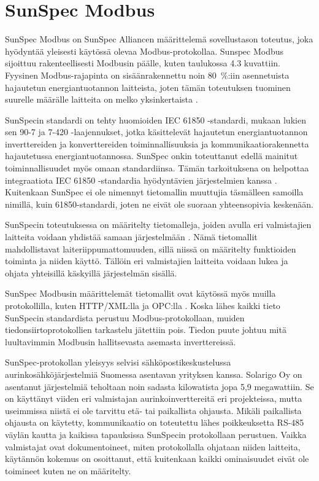 \section{SunSpec Modbus}
  SunSpec Modbus on SunSpec Alliancen määrittelemä sovellustason toteutus, joka hyödyntää yleisesti käytössä olevaa Modbus-protokollaa. Sunspec Modbus sijoittuu rakenteellisesti Modbusin päälle, kuten taulukossa 4.3 kuvattiin. Fyysinen Modbus-rajapinta on sisäänrakennettu noin \SI{80}{\percent}:iin asennetuista hajautetun energiantuotannon laitteista, joten tämän toteutuksen tuominen suurelle määrälle laitteita on melko yksinkertaista \parencite{SSFactSheet}.

  SunSpecin standardi on tehty huomioiden \gls{IEC} 61850 -standardi, mukaan lukien sen 90-7 ja 7-420 -laajennukset, jotka käsittelevät hajautetun energiantuotannon inverttereiden ja konverttereiden toiminnallisuuksia ja kommunikaatiorakennetta hajautetussa energiantuotannossa. SunSpec onkin toteuttanut edellä mainitut toiminnallisuudet myös omaan standardiinsa. Tämän tarkoituksena on helpottaa integraatiota \gls{IEC} 61850 -standardia hyödyntävien järjestelmien kanssa \parencite{SSTech}. Kuitenkaan SunSpec ei ole nimennyt tietomallin muuttujia täsmälleen samoilla nimillä, kuin 61850-standardi, joten ne eivät ole suoraan yhteensopivia keskenään.

  SunSpecin toteutuksessa on määritelty tietomalleja, joiden avulla eri valmistajien laitteita voidaan yhdistää samaan järjestelmään \parencite{SSTech}. Nämä tietomallit mahdollistavat laiteriippumattomuuden, sillä niissä on määritelty funktioiden toiminta ja niiden käyttö. Tällöin eri valmistajien laitteita voidaan lukea ja ohjata yhteisillä käskyillä järjestelmän sisällä.

  SunSpec Modbusin määrittelemät tietomallit ovat käytössä myös muilla protokollilla, kuten \gls{HTTP}/\gls{XML}:lla ja \gls{OPC}:lla \parencite{SSTech}. Koska lähes kaikki tieto SunSpecin standardista perustuu Modbus-protokollaan, muiden tiedonsiirtoprotokollien tarkastelu jätettiin pois. Tiedon puute johtuu mitä luultavimmin Modbusin hallitsevasta asemasta inverttereissä.

  SunSpec-protokollan yleisyys selvisi sähköpostikeskustelussa aurinkosähköjärjestelmiä Suomessa asentavan yrityksen kanssa. Solarigo Oy on asentanut järjestelmiä teholtaan noin sadasta kilowatista jopa 5,9 megawattiin. Se on käyttänyt viiden eri valmistajan aurinkoinverttereitä eri projekteissa, mutta useimmissa niistä ei ole tarvittu etä- tai paikallista ohjausta. Mikäli paikallista ohjausta on käytetty, kommunikaatio on toteutettu lähes poikkeuksetta RS-485 väylän kautta ja kaikissa tapauksissa SunSpecin protokollaan perustuen. Vaikka valmistajat ovat dokumentoineet, miten protokollalla ohjataan niiden laitteita, käytännön kokemus on osoittanut, että kuitenkaan kaikki ominaisuudet eivät ole toimineet kuten ne on määritelty. \parencite{Solarigo}



